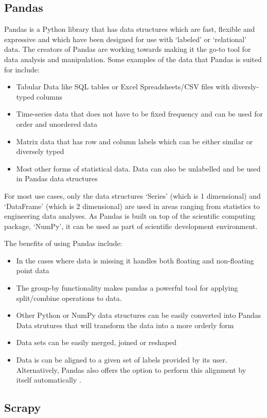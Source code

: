 \subsection{Pandas}
Pandas is a Python library that has data structures which are fast, flexible and expressive and which have been designed for use with ‘labeled’ or ‘relational’ data. The creators of Pandas are working towards making it the go-to tool for data analysis and manipulation. Some examples of the data that Pandas is suited for include:
\begin{itemize}
	\item Tabular Data like SQL tables or Excel Spreadsheets/CSV files with diversly-typed columns
	\item Time-series data that does not have to be fixed frequency and can be used for order and unordered data
	\item Matrix data that has row and column labels which can be either similar or diversely typed
	\item Most other forms of statistical data. Data can also be unlabelled and be used in Pandas data structures
\end{itemize}
For most use cases, only the data structures ‘Series’ (which is 1 dimensional) and ‘DataFrame’ (which is 2 dimensional) are used in areas ranging from statistics to engineering data analyses. 
As Pandas is built on top of the scientific computing package, ‘NumPy’, it can be used as part of scientific development environment.

The benefits of using Pandas include:
\begin{itemize}
	\item In the cases where data is missing it handles both floating and non-floating point data
	\item The group-by functionality makes pandas a powerful tool for applying split/combine operations to data.
	\item Other Python or NumPy data structures can be easily converted into Pandas Data strutures that will transform the data into a more orderly form
	\item Data sets can be easily merged, joined or reshaped
	\item Data is can be aligned to a given set of labels provided by its user. Alternatively, Pandas also offers the option to perform this alignment by itself automatically \cite{pandas}.
\end{itemize}
\subsection{Scrapy}
